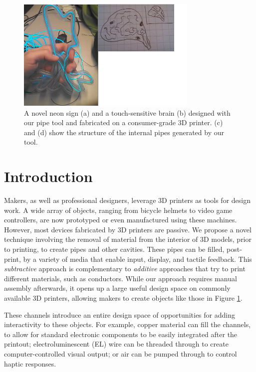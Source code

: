 \begin{figure}[h]
\centering
    \includegraphics[width=3.4in]{figures/placeholder/teaser.png}
\caption{A novel neon sign (a) and a touch-sensitive brain (b) designed with our pipe tool and fabricated on a consumer-grade 3D printer.  (c) and (d) show the structure of the internal pipes generated by our tool.   }
\label{fig:teaser}
\end{figure}

\section{Introduction}

Makers, as well as professional designers, leverage 3D printers as tools for design work.  A wide array of objects, ranging from bicycle helmets to video game controllers, are now prototyped or even manufactured using these machines.  However, most devices fabricated by 3D printers are passive.  We propose a novel technique involving the removal of material from the interior of 3D models, prior to printing, to create pipes and other cavities.  These pipes can be filled, post-print, by a variety of media that enable input, display, and tactile feedback.  This {\em subtractive} approach is complementary to {\em additive} approaches that try to print different materials, such as conductors. While our approach requires manual assembly afterwards, it opens up a large useful design space on commonly available 3D printers, allowing makers to create objects like those in Figure \ref{fig:teaser}.

These channels introduce an entire design space of opportunities for adding interactivity to these objects. For example, copper material can fill the channels, to allow for standard electronic components to be easily integrated after the printout; electroluminescent (EL) wire can be threaded through to create computer-controlled visual output; or air can be pumped through to control haptic responses.

